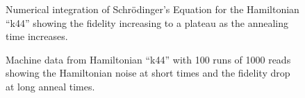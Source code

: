 \begin{figure}
	\caption[Simulation of Schr\"odinger's Equation]{Numerical integration of Schr\"odinger's Equation for the Hamiltonian ``k44'' showing the fidelity increasing to a plateau as the annealing time increases.}
	\label{fig:simulated_anneal}
\end{figure}

\begin{figure}
	\caption[Long Time Anneal]{Machine data from Hamiltonian ``k44'' with 100 runs of 1000 reads showing the Hamiltonian noise at short times and the fidelity drop at long anneal times.}
	\label{fig:k44_long}
\end{figure}
